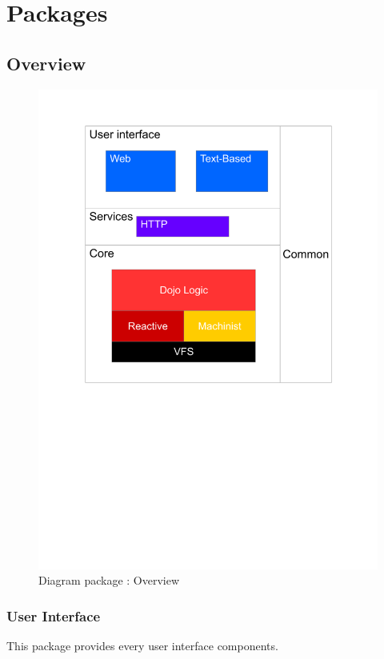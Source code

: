 \chapter{Packages}

\section{Overview}
	\begin{figure}[ht]
			\begin{center}
				\includegraphics[width=\textwidth,  trim=2cm 12cm 2cm 1cm]{UML_figure/DP/general/DP_General.pdf}
				\caption{Diagram package : Overview}
			\end{center}
	\end{figure}
	\newpage
	\subsection{User Interface}
		This package provides every user interface components.
